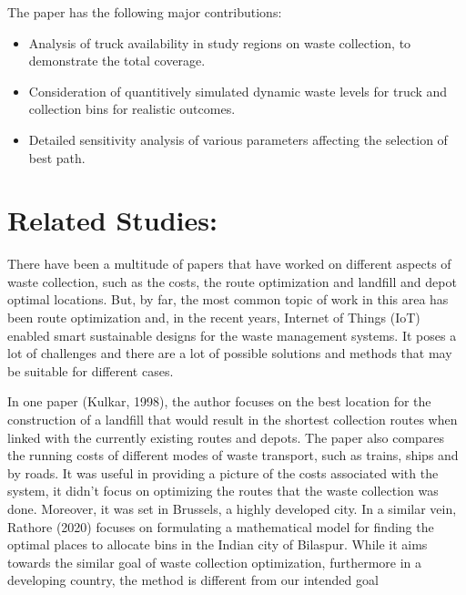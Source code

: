 \documentclass[12pt]{article}
\begin{document}
The paper has the following major contributions:
\begin{itemize}
\item Analysis of truck availability in study regions on waste collection, to demonstrate the total coverage.
\item Consideration of quantitively simulated dynamic waste levels for truck and
collection bins for realistic outcomes.
\item Detailed sensitivity analysis of various parameters affecting the selection of best path.
\end{itemize}

\section{Related Studies:}

There have been a multitude of papers that have worked on different aspects of waste collection, such as the costs, the route optimization and landfill and depot optimal locations. But, by far, the most common topic of work in this area has been route optimization and, in the recent years, Internet of Things (IoT) enabled smart sustainable designs for the waste management systems. It poses a lot of challenges and there are a lot of possible solutions and methods that may be suitable for different cases. 

In one paper (Kulkar, 1998), the author focuses on the best location for the construction of a landfill that would result in the shortest collection routes when linked with the currently existing routes and depots. The paper also compares the running costs of different modes of waste transport, such as trains, ships and by roads. It was useful in providing a picture of the costs associated with the system, it didn't focus on optimizing the routes that the waste collection was done. Moreover, it was set in Brussels, a highly developed city. In a similar vein, Rathore (2020) focuses on formulating a mathematical model for finding the optimal places to allocate bins in the Indian city of Bilaspur. While it aims towards the similar goal of waste collection optimization, furthermore in a developing country, the method is different from our intended goal
\end{document}

